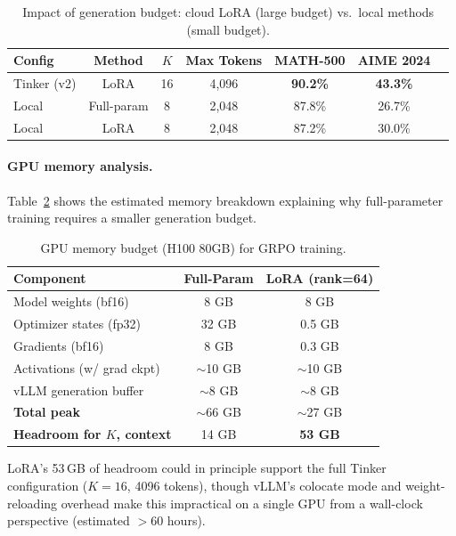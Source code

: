 \documentclass[11pt,a4paper]{article}
\begin{document}
\begin{table}[H]
\centering
\caption{Impact of generation budget: cloud LoRA (large budget) vs.\ local methods (small budget).}
\label{tab:gen-budget}
\begin{tabular}{lcccccc}
\toprule
\textbf{Config} & \textbf{Method} & $K$ & \textbf{Max Tokens} & \textbf{MATH-500} & \textbf{AIME 2024} \\
\midrule
Tinker (v2) & LoRA & 16 & 4,096 & \textbf{90.2\%} & \textbf{43.3\%} \\
Local & Full-param & 8 & 2,048 & 87.8\% & 26.7\% \\
Local & LoRA & 8 & 2,048 & 87.2\% & 30.0\% \\
\bottomrule
\end{tabular}
\end{table}

\paragraph{GPU memory analysis.} Table~\ref{tab:memory} shows the estimated memory breakdown explaining why full-parameter training requires a smaller generation budget.

\begin{table}[H]
\centering
\caption{GPU memory budget (H100 80GB) for GRPO training.}
\label{tab:memory}
\begin{tabular}{lcc}
\toprule
\textbf{Component} & \textbf{Full-Param} & \textbf{LoRA (rank=64)} \\
\midrule
Model weights (bf16) & 8 GB & 8 GB \\
Optimizer states (fp32) & 32 GB & 0.5 GB \\
Gradients (bf16) & 8 GB & 0.3 GB \\
Activations (w/ grad ckpt) & $\sim$10 GB & $\sim$10 GB \\
vLLM generation buffer & $\sim$8 GB & $\sim$8 GB \\
\midrule
\textbf{Total peak} & $\sim$66 GB & $\sim$27 GB \\
\textbf{Headroom for $K$, context} & 14 GB & \textbf{53 GB} \\
\bottomrule
\end{tabular}
\end{table}

LoRA's 53\,GB of headroom could in principle support the full Tinker configuration ($K=16$, 4096 tokens), though vLLM's colocate mode and weight-reloading overhead make this impractical on a single GPU from a wall-clock perspective (estimated $>$60 hours).
\end{document}
